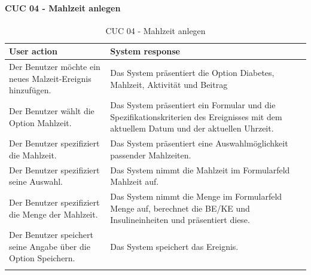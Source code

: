 \paragraph{CUC 04 - Mahlzeit anlegen}
\begin{center}
	\begin{longtable}[H]{|p{6cm}|p{6cm}|}
		\hline
		\textbf{User action} & \textbf{System response}\\
		\hline
		Der Benutzer möchte ein neues Malzeit-Ereignis hinzufügen. & Das System präsentiert die Option \glqq Diabetes\grqq{}, \glqq Mahlzeit\grqq{}, \glqq Aktivität\grqq{} und \glqq Beitrag\grqq{}\\
		\hline
		Der Benutzer wählt die Option \glqq Mahlzeit\grqq{}. & Das System präsentiert ein Formular und die Spezifikationskriterien des Ereignisses mit dem aktuellem Datum und der aktuellen Uhrzeit.\\
		\hline
		Der Benutzer spezifiziert die Mahlzeit. & Das System präsentiert eine Auswahlmöglichkeit passender Mahlzeiten.\\
		\hline
		Der Benutzer spezifiziert seine Auswahl. & Das System nimmt die Mahlzeit im Formularfeld \glqq Mahlzeit\grqq{} auf.\\
		\hline
		Der Benutzer spezifiziert die Menge der Mahlzeit. & Das System nimmt die Menge im Formularfeld \glqq Menge\grqq{} auf, berechnet die BE/KE und Insulineinheiten und präsentiert diese.\\
		\hline
		Der Benutzer speichert seine Angabe über die Option \glqq Speichern\grqq{}. & Das System speichert das Ereignis.\\
		\hline
		\captionsetup{justification=centering}
		\caption{CUC 04 - Mahlzeit anlegen}
		\label{tab:Persona Use Cases 4}
	\end{longtable}
\end{center}
